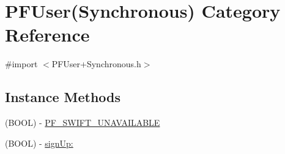 \hypertarget{category_p_f_user_07_synchronous_08}{}\section{P\+F\+User(Synchronous) Category Reference}
\label{category_p_f_user_07_synchronous_08}


{\ttfamily \#import $<$P\+F\+User+\+Synchronous.\+h$>$}

\subsection*{Instance Methods}
\begin{DoxyCompactItemize}
\item 
(B\+O\+O\+L) -\/ \hyperlink{category_p_f_user_07_synchronous_08_a61743931dba4d9a00bf20a5e942ae830}{P\+F\+\_\+\+S\+W\+I\+F\+T\+\_\+\+U\+N\+A\+V\+A\+I\+L\+A\+B\+L\+E}
\begin{DoxyCompactList}\small\item\em 

 \end{DoxyCompactList}\item 
(B\+O\+O\+L) -\/ \hyperlink{category_p_f_user_07_synchronous_08_a20cdf3d969a008fa99114dc26f0e092c}{sign\+Up\+:}
\end{DoxyCompactItemize}
